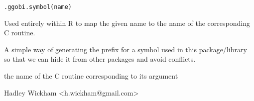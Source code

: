 \documentclass{article}
\begin{document}
\begin{Description}\relax
\end{Description}
\begin{Usage}
\begin{verbatim}.ggobi.symbol(name)\end{verbatim}
\end{Usage}
\begin{Arguments}
\begin{ldescription}
\item[\code{name}] 
\end{ldescription}
\end{Arguments}
\begin{Details}\relax
Used entirely within R to map the given name to the name of the
corresponding C routine.

A simple way of generating the prefix for a symbol
used in this package/library so that we can hide
it from other packages and avoid conflicts.
\end{Details}
\begin{Value}
the name of the C routine corresponding to its argument
\end{Value}
\begin{Author}\relax
Hadley Wickham <h.wickham@gmail.com>
\end{Author}
\begin{Examples}
\begin{ExampleCode}\end{ExampleCode}
\end{Examples}
\end{document}
